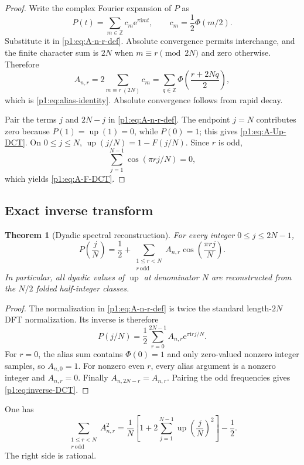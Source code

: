 \documentclass[11pt,oneside]{article}
\newtheorem{theorem}{Theorem}[section]
\theoremstyle{definition}
\theoremstyle{remark}
\newcommand{\Z}{\mathbb Z}
\newcommand{\Up}{\operatorname{up}}
\newcommand{\e}{\mathrm e}
\newcommand{\ii}{\mathrm i}
\newcommand{\PhiU}{\Phi}
\begin{document}
\begin{proof}
Write the complex Fourier expansion of $P$ as
\[
 P(t)=\sum_{m\in\Z}c_m\e^{\pi\ii mt},
 \qquad c_m=\frac12\PhiU(m/2).
\]
Substitute it in \eqref{p1:eq:A-n-r-def}.  Absolute convergence permits
interchange, and the finite character sum is $2N$ when $m\equiv r\pmod{2N}$
and zero otherwise.  Therefore
\[
 A_{n,r}=2\sum_{m\equiv r\ (2N)}c_m
 =\sum_{q\in\Z}\PhiU\!\left(\frac{r+2Nq}{2}\right),
\]
which is \eqref{p1:eq:alias-identity}.  Absolute convergence follows from rapid
decay.

Pair the terms $j$ and $2N-j$ in \eqref{p1:eq:A-n-r-def}.  The endpoint
$j=N$ contributes zero because $P(1)=\Up(1)=0$, while $P(0)=1$; this gives
\eqref{p1:eq:A-Up-DCT}.  On $0\le j\le N$,
$\Up(j/N)=1-F(j/N)$.  Since $r$ is odd,
\[
 \sum_{j=1}^{N-1}\cos(\pi rj/N)=0,
\]
which yields \eqref{p1:eq:A-F-DCT}.
\end{proof}

\subsection{Exact inverse transform}

\begin{theorem}[Dyadic spectral reconstruction]\label{p1:thm:inverse-DCT}
For every integer $0\le j\le2N-1$,
\begin{equation}\label{p1:eq:inverse-DCT}
 \boxed{
 P\!\left(\frac jN\right)
 =\frac12+
 \sum_{\substack{1\le r<N\\r\ \mathrm{odd}}}
 A_{n,r}\cos\!\left(\frac{\pi rj}{N}\right).}
\end{equation}
In particular, all dyadic values of $\Up$ at denominator $N$ are reconstructed
from the $N/2$ folded half-integer classes.
\end{theorem}

\begin{proof}
The normalization in \eqref{p1:eq:A-n-r-def} is twice the standard length-$2N$
DFT normalization.  Its inverse is therefore
\[
 P(j/N)=\frac12\sum_{r=0}^{2N-1}A_{n,r}\e^{\pi\ii rj/N}.
\]
For $r=0$, the alias sum contains $\PhiU(0)=1$ and only zero-valued nonzero
integer samples, so $A_{n,0}=1$.  For nonzero even $r$, every alias argument is
a nonzero integer and $A_{n,r}=0$.  Finally
$A_{n,2N-r}=A_{n,r}$.  Pairing the odd frequencies gives
\eqref{p1:eq:inverse-DCT}.
\end{proof}

\begin{corollary}\label{p1:cor:discrete-energy}
One has
\begin{equation}\label{p1:eq:discrete-energy}
 \boxed{
 \sum_{\substack{1\le r<N\\r\ \mathrm{odd}}}A_{n,r}^2
 =\frac1N\left[1+2\sum_{j=1}^{N-1}
 \Up\!\left(\frac jN\right)^2\right]-\frac12.}
\end{equation}
The right side is rational.
\end{corollary}
\end{document}
